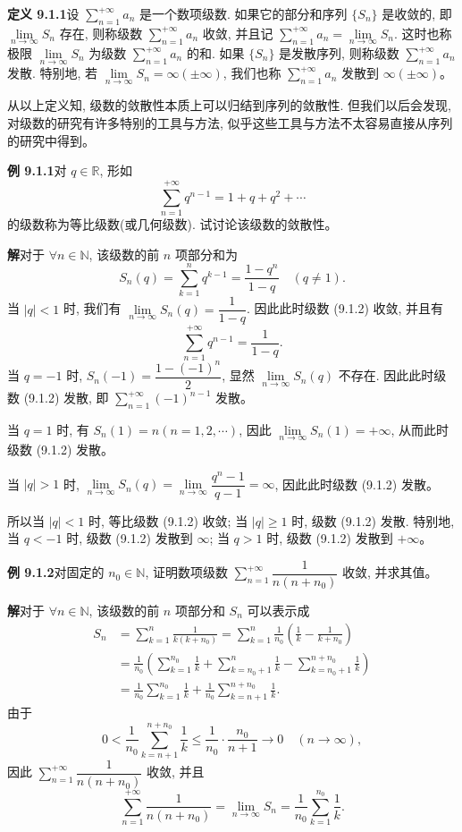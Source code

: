 \documentclass[UTF8, 12pt, fontset=fandol, oneside]{ctexart}
\begin{document}
\noindent\textbf{定义 9.1.1}\quad 设 $\sum\limits_{n=1}^{+\infty}a_n$ 是一个数项级数. 如果它的部分和序列 $\{S_n\}$ 是收敛的, 即 $\lim\limits_{n\to\infty}S_n$ 存在, 则称级数 $\sum\limits_{n=1}^{+\infty}a_n$ 收敛, 并且记 $\sum\limits_{n=1}^{+\infty}a_n=\lim\limits_{n\to\infty}S_n$. 这时也称极限 $\lim\limits_{n\to\infty}S_n$ 为级数 $\sum\limits_{n=1}^{+\infty}a_n$ 的和. 如果 $\{S_n\}$ 是发散序列, 则称级数 $\sum\limits_{n=1}^{+\infty}a_n$ 发散. 特别地, 若 $\lim\limits_{n\to\infty}S_n=\infty(\pm\infty)$, 我们也称 $\sum\limits_{n=1}^{+\infty}a_n$ 发散到 $\infty(\pm\infty)$。

从以上定义知, 级数的敛散性本质上可以归结到序列的敛散性. 但我们以后会发现, 对级数的研究有许多特别的工具与方法, 似乎这些工具与方法不太容易直接从序列的研究中得到。

\noindent\textbf{例 9.1.1}\quad 对 $q\in\mathbb R$, 形如
\begin{equation}
  \sum_{n=1}^{+\infty}q^{n-1}=1+q+q^2+\cdots
  \tag{9.1.2}
\end{equation}
的级数称为等比级数(或几何级数). 试讨论该级数的敛散性。

\noindent\textbf{解}\quad 对于 $\forall n\in\mathbb N$, 该级数的前 $n$ 项部分和为
\[
  S_n(q)=\sum_{k=1}^n q^{k-1}=\frac{1-q^n}{1-q}\quad(q\neq1).
\]
当 $|q|<1$ 时, 我们有 $\lim\limits_{n\to\infty}S_n(q)=\dfrac1{1-q}$. 因此此时级数 (9.1.2) 收敛, 并且有
\[
  \sum_{n=1}^{+\infty}q^{n-1}=\frac1{1-q}.
\]
当 $q=-1$ 时, $S_n(-1)=\dfrac{1-(-1)^n}{2}$, 显然 $\lim\limits_{n\to\infty}S_n(q)$ 不存在. 因此此时级数 (9.1.2) 发散, 即 $\sum\limits_{n=1}^{+\infty}(-1)^{n-1}$ 发散。

当 $q=1$ 时, 有 $S_n(1)=n(n=1,2,\cdots)$, 因此 $\lim\limits_{n\to\infty}S_n(1)=+\infty$, 从而此时级数 (9.1.2) 发散。

当 $|q|>1$ 时, $\lim\limits_{n\to\infty}S_n(q)=\lim\limits_{n\to\infty}\dfrac{q^n-1}{q-1}=\infty$, 因此此时级数 (9.1.2) 发散。

所以当 $|q|<1$ 时, 等比级数 (9.1.2) 收敛; 当 $|q|\geq1$ 时, 级数 (9.1.2) 发散. 特别地, 当 $q<-1$ 时, 级数 (9.1.2) 发散到 $\infty$; 当 $q>1$ 时, 级数 (9.1.2) 发散到 $+\infty$。

\noindent\textbf{例 9.1.2}\quad 对固定的 $n_0\in\mathbb N$, 证明数项级数 $\sum\limits_{n=1}^{+\infty}\dfrac1{n(n+n_0)}$ 收敛, 并求其值。

\noindent\textbf{解}\quad 对于 $\forall n\in\mathbb N$, 该级数的前 $n$ 项部分和 $S_n$ 可以表示成
\[
\begin{aligned}
  S_n
  &=\sum_{k=1}^n\frac1{k(k+n_0)}
    =\sum_{k=1}^n\frac1{n_0}\left(\frac1k-\frac1{k+n_0}\right)\\
  &=\frac1{n_0}\left(\sum_{k=1}^{n_0}\frac1k+\sum_{k=n_0+1}^n\frac1k-\sum_{k=n_0+1}^{n+n_0}\frac1k\right)\\
  &=\frac1{n_0}\sum_{k=1}^{n_0}\frac1k+\frac1{n_0}\sum_{k=n+1}^{n+n_0}\frac1k.
\end{aligned}
\]
由于
\[
  0<\frac1{n_0}\sum_{k=n+1}^{n+n_0}\frac1k\leq \frac1{n_0}\cdot\frac{n_0}{n+1}\to0\quad(n\to\infty),
\]
因此 $\sum\limits_{n=1}^{+\infty}\dfrac1{n(n+n_0)}$ 收敛, 并且
\[
  \sum_{n=1}^{+\infty}\frac1{n(n+n_0)}
  =\lim_{n\to\infty}S_n=\frac1{n_0}\sum_{k=1}^{n_0}\frac1k.
\]
\end{document}
